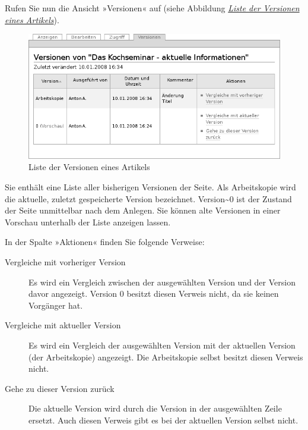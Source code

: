 \documentclass[a4paper,12pt,ngerman]{manual}
\begin{document}
Rufen Sie nun die Ansicht »Versionen« auf (siehe
Abbildung \hyperlink{fig-historie-tutorium}{\emph{Liste der Versionen eines Artikels}}).
\hypertarget{fig-historie-tutorium}{}\begin{figure}[htbp]
\centering

\includegraphics{historie-tutorium.png}
\caption{Liste der Versionen eines Artikels}\end{figure}

Sie enthält eine Liste aller bisherigen Versionen der Seite. Als
Arbeitskopie wird die aktuelle, zuletzt gespeicherte Version
bezeichnet. Version\textasciitilde{}0 ist der Zustand der Seite unmittelbar nach dem
Anlegen. Sie können alte Versionen in einer Vorschau unterhalb der
Liste anzeigen lassen.

In der Spalte »Aktionen« finden Sie folgende Verweise:
\begin{description}
\item[Vergleiche mit vorheriger Version] \leavevmode
Es wird ein Vergleich zwischen der
ausgewählten Version und der Version davor angezeigt. Version 0 besitzt
diesen Verweis nicht, da sie keinen Vorgänger hat.

\item[Vergleiche mit aktueller Version] \leavevmode
Es wird ein Vergleich der ausgewählten
Version mit der aktuellen Version (der Arbeitskopie) angezeigt. Die
Arbeitskopie selbst besitzt diesen Verweis nicht.

\item[Gehe zu dieser Version zurück] \leavevmode
Die aktuelle Version wird durch die
Version in der ausgewählten Zeile ersetzt. Auch diesen Verweis gibt es bei
der aktuellen Version selbst nicht.

\end{description}
\end{document}
